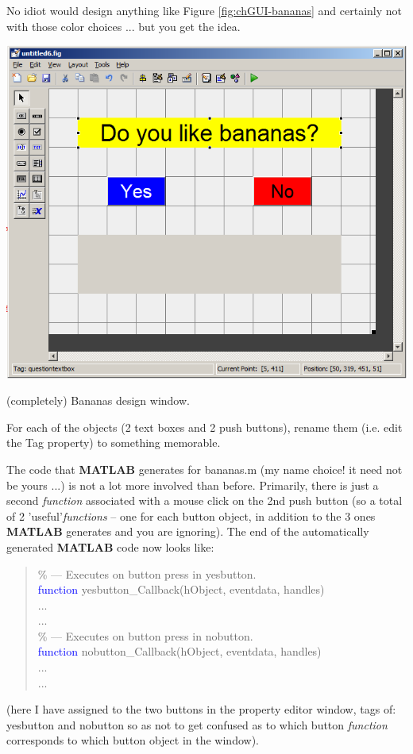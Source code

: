 \documentclass{tufte-book} %
\newenvironment{docspecmargin}{\begin{quotation}\ttfamily\footnotesize\parskip0pt\parindent0pt\ignorespaces}{\end{quotation}}
\begin{document}
No idiot would design anything like Figure \ref{fig:chGUI-bananas} and certainly not with those color choices ... but you get the idea.

\begin{marginfigure}[0.0in]
\includegraphics[width=\linewidth]{chGUI-bananas.png}
\caption{(completely) Bananas design window.}
\label{fig:chGUI-bananas}
\end{marginfigure}

For each of the objects (2 text boxes and 2 push buttons),  rename them (i.e. edit the \textsf{Tag} property) to something  memorable.

The code that \textbf{MATLAB} generates for \textsf{bananas.m} (my name choice! it need not be yours ...) is not a lot more involved than before. Primarily, there is just a second \textit{function} associated with a mouse click on the 2nd push button (so a total of 2  'useful'\textit{functions} -- one for each button object, in addition to the 3 ones \textbf{MATLAB} generates and you are ignoring). The end of the automatically generated \textbf{MATLAB} code now looks like:
\begin{docspecmargin}
\textcolor[rgb]{0,0.501961,0}{\% --- Executes on button press in yesbutton.}
\\\textcolor{blue}{function} yesbutton\_Callback(hObject, eventdata, handles)
\\...
\\...
\\\textcolor[rgb]{0,0.501961,0}{\% --- Executes on button press in nobutton.}
\\\textcolor{blue}{function} nobutton\_Callback(hObject, eventdata, handles)
\\...
\\...
\end{docspecmargin}
(here I have assigned to the two buttons in the property editor window, \textsf{tags} of: \textsf{yesbutton} and \textsf{nobutton} so as not to get confused as to which button \textit{function} corresponds to which button object in the window).
\end{document}
